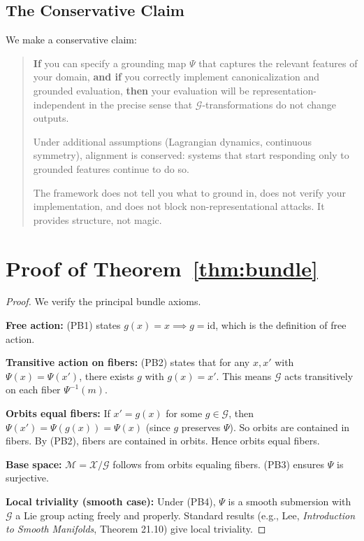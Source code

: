 \documentclass[12pt]{article}
\theoremstyle{definition}
\theoremstyle{remark}
\newcommand{\calX}{\mathcal{X}}
\newcommand{\calM}{\mathcal{M}}
\newcommand{\calG}{\mathcal{G}}
\begin{document}
\subsection{The Conservative Claim}

We make a conservative claim:

\begin{quote}
\textbf{If} you can specify a grounding map $\Psi$ that captures the relevant features of your domain, \textbf{and if} you correctly implement canonicalization and grounded evaluation, \textbf{then} your
evaluation will be representation-independent in the precise sense that $\calG$-transformations
do not change outputs.

Under additional assumptions (Lagrangian dynamics, continuous symmetry), alignment
is conserved: systems that start responding only to grounded features continue to do so.

The framework does not tell you what to ground in, does not verify your implementation,
and does not block non-representational attacks. It provides structure, not magic.
\end{quote}

\appendix

\section{Proof of Theorem~\ref{thm:bundle}}\label{app:bundle-proof}

\begin{proof}
We verify the principal bundle axioms.

\textbf{Free action:} (PB1) states $g(x) = x \implies g = \mathrm{id}$, which is the definition of free action.

\textbf{Transitive action on fibers:} (PB2) states that for any $x, x'$ with $\Psi(x) = \Psi(x')$, there
exists $g$ with $g(x) = x'$. This means $\calG$ acts transitively on each fiber $\Psi^{-1}(m)$.

\textbf{Orbits equal fibers:} If $x' = g(x)$ for some $g \in \calG$, then $\Psi(x') = \Psi(g(x)) = \Psi(x)$ (since $g$
preserves $\Psi$). So orbits are contained in fibers. By (PB2), fibers are contained in orbits. Hence
orbits equal fibers.

\textbf{Base space:} $\calM = \calX/\calG$ follows from orbits equaling fibers. (PB3) ensures $\Psi$ is surjective.

\textbf{Local triviality (smooth case):} Under (PB4), $\Psi$ is a smooth submersion with $\calG$ a Lie
group acting freely and properly. Standard results (e.g., Lee, \emph{Introduction to Smooth Manifolds},
Theorem 21.10) give local triviality.
\end{proof}
\end{document}
